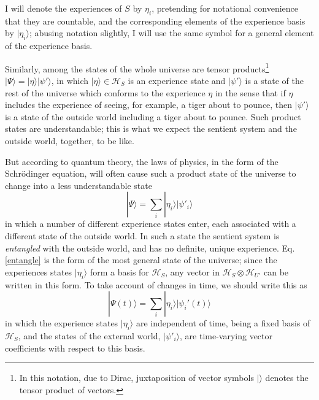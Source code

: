 \documentclass[12pt,reqno]{article}
\renewcommand{\(}{\left(}
\renewcommand{\)}{\right)}
\renewcommand{\H}{\mathcal{H}}
\newcommand{\<}{\langle}
\renewcommand{\>}{\rangle}
\newcommand{\be}{\begin{equation}}
\newcommand{\ee}{\end{equation}}
\theoremstyle{plain} %
\begin{document}
I will denote the experiences of $S$ by $\eta_i$, pretending for notational convenience that they are countable, and the corresponding elements of the experience basis by $|\eta_i\>$; abusing notation slightly, I will use the same symbol for a general element of the experience basis. 

Similarly, among the states of the whole universe are tensor products\footnote{In this notation, due to Dirac, juxtaposition of vector symbols $|\>$ denotes the tensor product of vectors.}  $|\Psi\> = |\eta\>|\psi'\>$, in which $|\eta\>\in\H_S$ is an experience state and $|\psi'\>$ is a state of the rest of the universe which conforms to the experience $\eta$ in the sense that if $\eta$ includes the experience of seeing, for example, a tiger about to pounce, then $|\psi'\>$ is a state of the outside world including a tiger about to pounce. Such product states are understandable; this is what we expect the sentient system and the outside world, together, to be like. 

But according to quantum theory, the laws of physics, in the form of the Schr\"odinger equation, will often cause such a product state of the universe to change into a less understandable state
\be\label{entangle}
|\Psi\> = \sum_i |\eta_i\>|\psi'_i\>
\ee
in which a number of different experience states enter, each associated with a different state of the outside world. In such a state the sentient system is \emph{entangled} with the outside world, and has no definite, unique experience. Eq. \eqref{entangle} is the form of the most general state of the universe; since the experiences states $|\eta_i\>$ form a basis for $\H_S$, any vector in $\H_S \otimes \H_{U'}$ can be written in this form. To take account of changes in time, we should write this as
\be\label{universe}
|\Psi(t)\> = \sum_i|\eta_i\>|\psi_i'(t)\>
\ee
in which the experience states $|\eta_i\>$ are independent of time, being a fixed basis of $\H_S$, and the states of the external world, $|\psi'_i\>$, are time-varying vector coefficients with respect to this basis.
\end{document}

